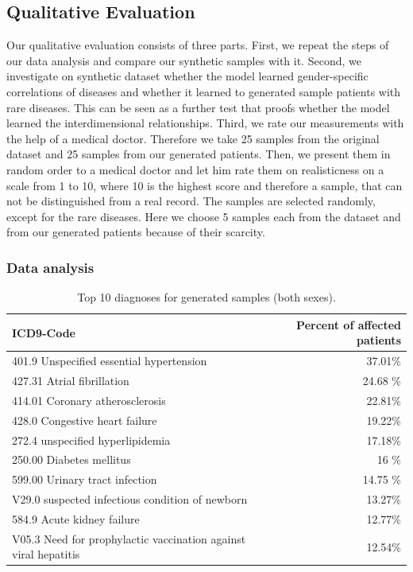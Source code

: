 \documentclass[11pt, a4paper]{book}
\begin{document}
\subsection{Qualitative Evaluation}
Our qualitative evaluation consists of three parts. First, we repeat the steps of our data analysis and compare our synthetic samples with it. Second, we investigate on synthetic dataset whether the model learned gender-specific correlations of diseases and whether it learned to generated sample patients with rare diseases. This can be seen as a further test that proofs whether the model learned the interdimensional relationships. Third, we rate our measurements with the help of a medical doctor. Therefore we take 25 samples from the original dataset and 25 samples from our generated patients. Then, we present them in random order to a medical doctor and let him rate them on realisticness on a scale from 1 to 10, where 10 is the highest score and therefore a sample, that can not be distinguished from a real record.
The samples are selected randomly, except for the rare diseases. Here we choose 5 samples each from the dataset and from our generated patients because of their scarcity.

\subsubsection{Data analysis}

\begin{table}
\begin{tabular}{l|r}
\textbf{ICD9-Code} & \textbf{Percent of affected patients}\\
\hline
401.9 Unspecified essential hypertension & 37.01\%\\
427.31 Atrial fibrillation & 24.68 \%\\
414.01 Coronary atherosclerosis & 22.81\%\\
428.0 Congestive heart failure & 19.22\%\\
272.4 unspecified hyperlipidemia & 17.18\%\\
250.00 Diabetes mellitus & 16 \%\\
599.00 Urinary tract infection & 14.75 \%\\
V29.0 suspected infectious condition of newborn & 13.27\%\\
584.9 Acute kidney failure & 12.77\%\\
V05.3 Need for prophylactic vaccination against viral hepatitis & 12.54\%\\
\end{tabular}
\caption{\label{tab:top10-icd-mixed}Top 10 diagnoses for generated samples (both sexes).}
\end{table}
\end{document}
